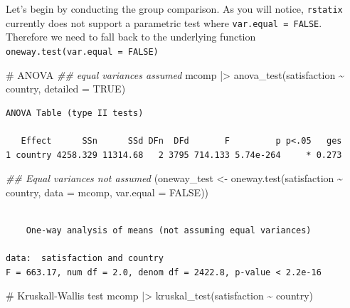 \documentclass[
  letterpaper,
  DIV=11,
  numbers=noendperiod]{scrreprt}
\newenvironment{Shaded}{\begin{snugshade}}{\end{snugshade}}
\newcommand{\AttributeTok}[1]{\textcolor[rgb]{0.40,0.45,0.13}{#1}}
\newcommand{\CommentTok}[1]{\textcolor[rgb]{0.37,0.37,0.37}{#1}}
\newcommand{\ConstantTok}[1]{\textcolor[rgb]{0.56,0.35,0.01}{#1}}
\newcommand{\DocumentationTok}[1]{\textcolor[rgb]{0.37,0.37,0.37}{\textit{#1}}}
\newcommand{\FunctionTok}[1]{\textcolor[rgb]{0.28,0.35,0.67}{#1}}
\newcommand{\NormalTok}[1]{\textcolor[rgb]{0.00,0.23,0.31}{#1}}
\newcommand{\OtherTok}[1]{\textcolor[rgb]{0.00,0.23,0.31}{#1}}
\newcommand{\SpecialCharTok}[1]{\textcolor[rgb]{0.37,0.37,0.37}{#1}}
\begin{document}
Let's begin by conducting the group comparison. As you will notice,
\texttt{rstatix} currently does not support a parametric test where
\texttt{var.equal\ =\ FALSE}. Therefore we need to fall back to the
underlying function \texttt{oneway.test(var.equal\ =\ FALSE)}

\begin{Shaded}
\begin{Highlighting}[]
\CommentTok{\# ANOVA}
\DocumentationTok{\#\# equal variances assumed}
\NormalTok{mcomp }\SpecialCharTok{|\textgreater{}}
  \FunctionTok{anova\_test}\NormalTok{(satisfaction }\SpecialCharTok{\textasciitilde{}}\NormalTok{ country,}
              \AttributeTok{detailed =} \ConstantTok{TRUE}\NormalTok{)}
\end{Highlighting}
\end{Shaded}

\begin{verbatim}
ANOVA Table (type II tests)

   Effect      SSn      SSd DFn  DFd       F         p p<.05   ges
1 country 4258.329 11314.68   2 3795 714.133 5.74e-264     * 0.273
\end{verbatim}

\begin{Shaded}
\begin{Highlighting}[]
\DocumentationTok{\#\# Equal variances not assumed}
\NormalTok{(oneway\_test }\OtherTok{\textless{}{-}} \FunctionTok{oneway.test}\NormalTok{(satisfaction }\SpecialCharTok{\textasciitilde{}}\NormalTok{ country,}
                            \AttributeTok{data =}\NormalTok{ mcomp,}
                            \AttributeTok{var.equal =} \ConstantTok{FALSE}\NormalTok{))}
\end{Highlighting}
\end{Shaded}

\begin{verbatim}

    One-way analysis of means (not assuming equal variances)

data:  satisfaction and country
F = 663.17, num df = 2.0, denom df = 2422.8, p-value < 2.2e-16
\end{verbatim}

\begin{Shaded}
\begin{Highlighting}[]
\CommentTok{\# Kruskall{-}Wallis test}
\NormalTok{mcomp }\SpecialCharTok{|\textgreater{}} \FunctionTok{kruskal\_test}\NormalTok{(satisfaction }\SpecialCharTok{\textasciitilde{}}\NormalTok{ country)}
\end{Highlighting}
\end{Shaded}
\end{document}
